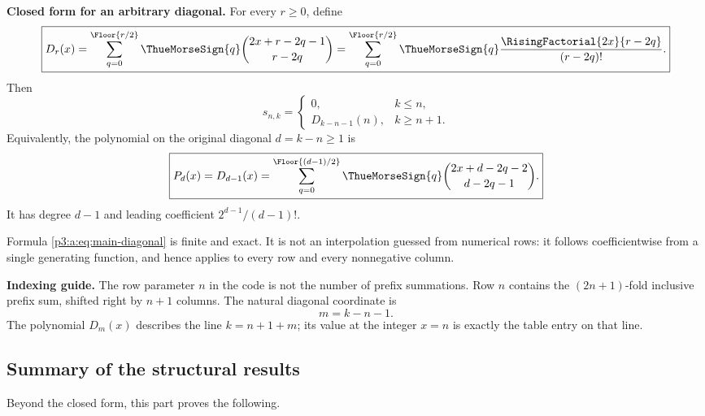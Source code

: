 \documentclass[11pt,oneside]{article}
\numberwithin{equation}{section}
\theoremstyle{definition}
\theoremstyle{remark}
\begin{document}
\begin{boxedsummary}
\textbf{Closed form for an arbitrary diagonal.}
For every \(r\ge0\), define
\begin{equation}
 \boxed{
 D_r(x)=
 \sum_{q=0}^{\Floor{r/2}}
 \ThueMorseSign{q}\binom{2x+r-2q-1}{r-2q}
 =\sum_{q=0}^{\Floor{r/2}}
 \ThueMorseSign{q}\frac{\RisingFactorial{2x}{r-2q}}{(r-2q)!}.}
 \label{p3:a:eq:main-diagonal}
\end{equation}
Then
\begin{equation}
 \boxed{
 s_{n,k}=\begin{cases}
 0,&k\le n,\\[2mm]
 D_{k-n-1}(n),&k\ge n+1.
 \end{cases}}
 \label{p3:a:eq:main-table-answer}
\end{equation}
Equivalently, the polynomial on the original diagonal \(d=k-n\ge1\) is
\begin{equation}
 \boxed{
 P_d(x)=D_{d-1}(x)=
 \sum_{q=0}^{\Floor{(d-1)/2}}
 \ThueMorseSign{q}\binom{2x+d-2q-2}{d-2q-1}.}
 \label{p3:a:eq:main-d-answer}
\end{equation}
It has degree \(d-1\) and leading coefficient \(2^{d-1}/(d-1)!\).
\end{boxedsummary}

Formula \eqref{p3:a:eq:main-diagonal} is finite and exact.  It is not an
interpolation guessed from numerical rows: it follows coefficientwise from a
single generating function, and hence applies to every row and every
nonnegative column.
\begin{resultbox}
\textbf{Indexing guide.}
The row parameter $n$ in the code is not the number of prefix summations.
Row $n$ contains the $(2n+1)$-fold inclusive prefix sum, shifted right by
$n+1$ columns.  The natural diagonal coordinate is
\[
 m=k-n-1.
\]
The polynomial $D_m(x)$ describes the line $k=n+1+m$; its value at the
integer $x=n$ is exactly the table entry on that line.
\end{resultbox}

\subsection{Summary of the structural results}

Beyond the closed form, this part proves the following.
\end{document}
